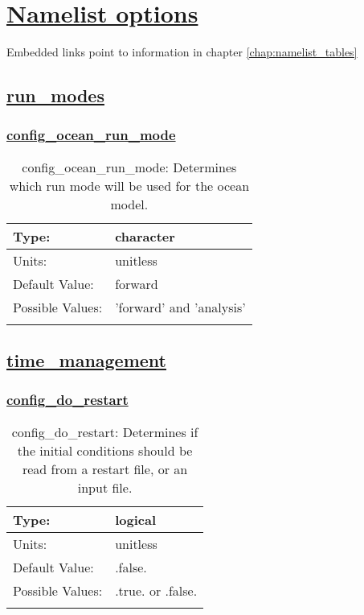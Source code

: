 \chapter[Namelist options]{\hyperref[chap:namelist_tables]{Namelist options}}
\label{chap:namelist_sections}
Embedded links point to information in chapter \ref{chap:namelist_tables}
\section[run\_modes]{\hyperref[sec:nm_tab_run_modes]{run\_modes}}
\label{sec:nm_sec_run_modes}
\subsection[config\_ocean\_run\_mode]{\hyperref[sec:nm_tab_run_modes]{config\_ocean\_run\_mode}}
\label{subsec:nm_sec_config_ocean_run_mode}
\begin{center}
\begin{longtable}{| p{2.0in} || p{4.0in} |}
    \hline
    Type: & character \\
    \hline
    Units: & \si{unitless} \\
    \hline
    Default Value: & forward \\
    \hline
    Possible Values: & 'forward' and 'analysis' \\
    \hline
    \caption{config\_ocean\_run\_mode: Determines which run mode will be used for the ocean model.}
\end{longtable}
\end{center}
\section[time\_management]{\hyperref[sec:nm_tab_time_management]{time\_management}}
\label{sec:nm_sec_time_management}
\subsection[config\_do\_restart]{\hyperref[sec:nm_tab_time_management]{config\_do\_restart}}
\label{subsec:nm_sec_config_do_restart}
\begin{center}
\begin{longtable}{| p{2.0in} || p{4.0in} |}
    \hline
    Type: & logical \\
    \hline
    Units: & \si{unitless} \\
    \hline
    Default Value: & .false. \\
    \hline
    Possible Values: & .true. or .false. \\
    \hline
    \caption{config\_do\_restart: Determines if the initial conditions should be read from a restart file, or an input file.}
\end{longtable}
\end{center}
